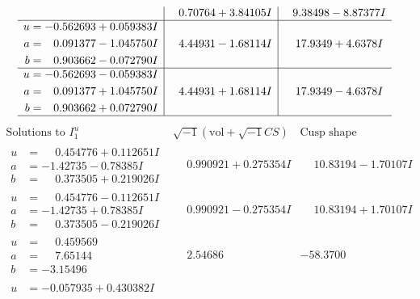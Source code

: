 \documentclass[1p]{elsarticle_modified}
\theoremstyle{definition}
\newcommand{\I}{\sqrt{-1}}
\begin{document}
$$\begin{array}{c|c|c}
 & \phantom{-}0.70764 + 3.84105 I & \phantom{-}9.38498 - 8.87377 I \\ \hline\begin{aligned}
u &= -0.562693 + 0.059383 I \\
a &= \phantom{-}0.091377 - 1.045750 I \\
b &= \phantom{-}0.903662 - 0.072790 I\end{aligned}
 & \phantom{-}4.44931 - 1.68114 I & \phantom{-}17.9349 + 4.6378 I \\ \hline\begin{aligned}
u &= -0.562693 - 0.059383 I \\
a &= \phantom{-}0.091377 + 1.045750 I \\
b &= \phantom{-}0.903662 + 0.072790 I\end{aligned}
 & \phantom{-}4.44931 + 1.68114 I & \phantom{-}17.9349 - 4.6378 I\\
 \hline 
 \end{array}$$\newpage$$\begin{array}{c|c|c}  
\text{Solutions to }I^u_{1}& \I (\text{vol} + \sqrt{-1}CS) & \text{Cusp shape}\\
 \hline 
\begin{aligned}
u &= \phantom{-}0.454776 + 0.112651 I \\
a &= -1.42735 - 0.78385 I \\
b &= \phantom{-}0.373505 + 0.219026 I\end{aligned}
 & \phantom{-}0.990921 + 0.275354 I & \phantom{-}10.83194 - 1.70107 I \\ \hline\begin{aligned}
u &= \phantom{-}0.454776 - 0.112651 I \\
a &= -1.42735 + 0.78385 I \\
b &= \phantom{-}0.373505 - 0.219026 I\end{aligned}
 & \phantom{-}0.990921 - 0.275354 I & \phantom{-}10.83194 + 1.70107 I \\ \hline\begin{aligned}
u &= \phantom{-}0.459569\phantom{ +0.000000I} \\
a &= \phantom{-}7.65144\phantom{ +0.000000I} \\
b &= -3.15496\phantom{ +0.000000I}\end{aligned}
 & \phantom{-}2.54686\phantom{ +0.000000I} & -58.3700\phantom{ +0.000000I} \\ \hline\begin{aligned}
u &= -0.057935 + 0.430382 I \\

\end{aligned}
\end{array}$$
\end{document}
